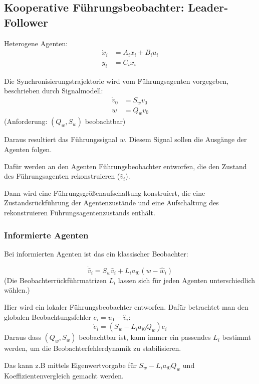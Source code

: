 \subsection{Kooperative Führungsbeobachter: Leader-Follower}
\label{sec:koop_beob}

Heterogene Agenten:
\begin{align}
    \dot{x}_i &= A_i x_i + B_i u_i \\
    y_i &= C_i x_i
\end{align}

Die Synchronisierungstrajektorie wird vom Führungsagenten vorgegeben, beschrieben
durch Signalmodell:
\begin{align}
    \dot{v}_0 &= S_w v_0 \\
    w &= Q_w v_0
\end{align}
(Anforderung: $(Q_w, S_w)$ beobachtbar)

Daraus resultiert das Führungssignal $w$.
Diesem Signal sollen die Ausgänge der Agenten folgen.

Dafür werden an den Agenten Führungsbeobachter entworfen, die den Zustand des
Führungsagenten rekonstruieren ($\hat{v}_i$).

Dann wird eine Führungsgrößenaufschaltung konstruiert, die eine Zustandsrückführung
der Agentenzustände und eine Aufschaltung des rekonstruieren
Führungsagentenzustands enthält.


\subsubsection{Informierte Agenten}

Bei informierten Agenten ist das ein klassischer Beobachter:

\begin{equation}
    \dot{\hat{v}}_i = S_w \hat{v}_i + L_i a_{i0} (w-\hat{w}_i)
\end{equation}
(Die Beobachterrückführmatrizen $L_i$ lassen sich für jeden Agenten
unterschiedlich wählen.)


Hier wird ein lokaler Führungsbeobachter entworfen.
Dafür betrachtet man den globalen Beobachtungsfehler $e_i = v_0 - \hat{v}_i$:
\begin{equation}
    \dot{e}_i = (S_w - L_i a_{i0} Q_w) e_i
\end{equation}
Daraus dass $(Q_w, S_w)$ beobachtbar ist, kann immer ein passendes $L_i$ bestimmt werden,
um die Beobachterfehlerdynamik zu stabilisieren.

Das kann z.B mittels Eigenwertvorgabe für $S_w - L_i a_{i0} Q_w$ und
Koeffizientenvergleich gemacht werden.

